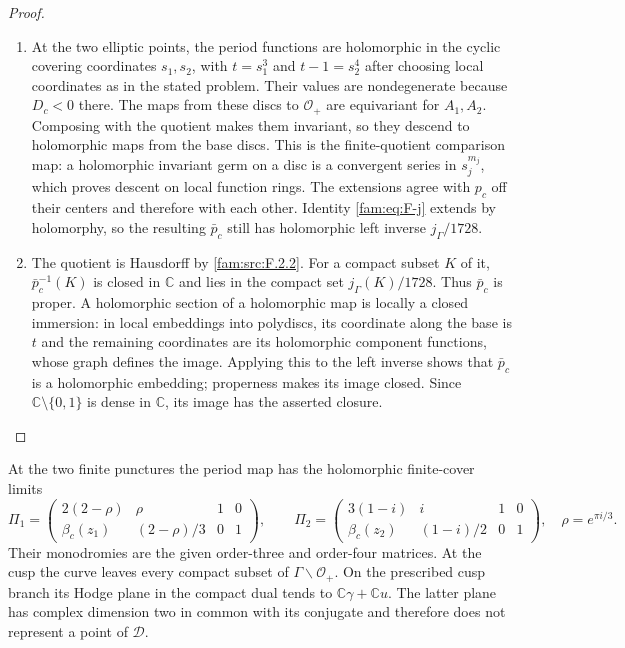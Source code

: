 \begin{proof}
\begin{enumerate}[label=\arabic*.,leftmargin=*]
\item At the two elliptic points, the period functions are holomorphic in the
cyclic covering coordinates $s_1,s_2$, with $t=s_1^3$ and
$t-1=s_2^4$ after choosing local coordinates as in the stated problem.  Their
values are nondegenerate because $D_c<0$ there.  The maps from these
discs to $\mathcal O_+$ are equivariant for $A_1,A_2$.  Composing with
the quotient makes them invariant, so they descend to holomorphic maps
from the base discs.  This is the finite-quotient comparison map: a
holomorphic invariant germ on a disc is a convergent series in $s_j^{m_j}$,
which proves descent on local function rings.  The extensions agree
with $p_c$ off their centers and therefore with each other.  Identity
\eqref{fam:eq:F-j} extends by holomorphy, so the resulting $\bar p_c$ still
has holomorphic left inverse $j_\Gamma/1728$.

\item The quotient is Hausdorff by \ref{fam:src:F.2.2}.  For a compact subset $K$ of it,
$\bar p_c^{-1}(K)$ is closed in $\mathbb C$ and lies in the compact set
$j_\Gamma(K)/1728$.  Thus $\bar p_c$ is proper.  A holomorphic section of
a holomorphic map is locally a closed immersion: in local embeddings
into polydiscs, its coordinate along the base is $t$ and the remaining
coordinates are its holomorphic component functions, whose graph
defines the image.  Applying this to the left inverse shows that
$\bar p_c$ is a holomorphic embedding; properness makes its image
closed.  Since $\mathbb C\setminus\{0,1\}$ is dense in $\mathbb C$, its
image has the asserted closure.
\end{enumerate}
\end{proof}

\begin{proposition}\hypertarget{tag-01RF}{}\label{fam:src:F.3.2}\label{fam:st:F.3.2}

At the two finite punctures the period map has the holomorphic
finite-cover limits
\[
 \Pi_1=
 \begin{pmatrix}2(2-\rho)&\rho&1&0\\
 \beta_c(z_1)&(2-\rho)/3&0&1\end{pmatrix},\qquad
 \Pi_2=
 \begin{pmatrix}3(1-i)&i&1&0\\
 \beta_c(z_2)&(1-i)/2&0&1\end{pmatrix},
 \quad \rho=e^{\pi i/3}.
\]
Their monodromies are the given order-three and order-four matrices.
At the cusp the curve leaves every compact subset of
$\Gamma\backslash\mathcal O_+$.  On the prescribed cusp branch its
Hodge plane in the compact dual tends to
$\mathbb C\gamma+\mathbb Cu$.  The latter plane has complex dimension
two in common with its conjugate and therefore does not represent a
point of $\mathcal D$.
\end{proposition}



